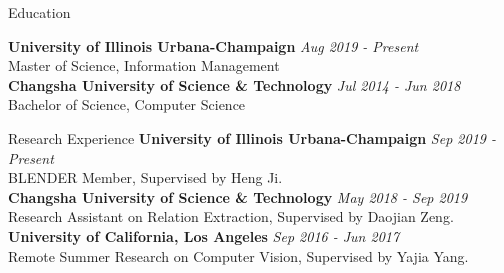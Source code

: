 \documentclass{resume} %
\begin{document}

\begin{rSection}{Education}

{\bf University of Illinois Urbana-Champaign} \hfill {\em Aug 2019 - Present} 
\\ Master of Science, Information Management
\medskip
\\{\bf Changsha University of Science \& Technology} \hfill {\em Jul 2014 - Jun 2018} 
\\ Bachelor of Science, Computer Science


\end{rSection}
\begin{rSection}{Research Experience}
{\bf University of Illinois Urbana-Champaign} \hfill {\em Sep 2019 - Present} 
\\ BLENDER Member, Supervised by Heng Ji. \medskip 
\\ {\bf Changsha University of Science \& Technology} \hfill {\em May 2018 - Sep 2019} 
\\ Research Assistant on Relation Extraction, Supervised by Daojian Zeng. \medskip
\\{\bf University of California, Los Angeles} \hfill {\em Sep 2016 - Jun 2017} 
\\ Remote Summer Research on Computer Vision, Supervised by Yajia Yang.

\end{rSection}
\end{document}
